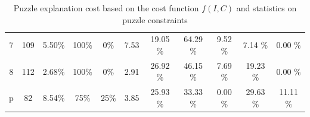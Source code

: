 \begin{table}
\begin{tabular}{c|cc|cc|c|ccccc}
		7          & 109                & 5.50\%             & 100\%                                              & 0\%                   & 7.53                                                                   & 19.05 \%      & 64.29 \%        & 9.52 \%       & 7.14 \%            & 0.00 \%      \\
		8          & 112                & 2.68\%             & 100\%                                              & 0\%                   & 2.91                                                                   & 26.92 \%      & 46.15 \%        & 7.69 \%       & 19.23 \%           & 0.00 \%      \\
		p          & 82                 & 8.54\%             & 75\%                                               & 25\%                  & 3.85                                                                   & 25.93 \%      & 33.33 \%        & 0.00 \%       & 29.63 \%           & 11.11 \%
	\end{tabular}
	\caption{Puzzle explanation cost based on the cost function $f(I, C)$ and statistics on puzzle constraints}
\end{table}


